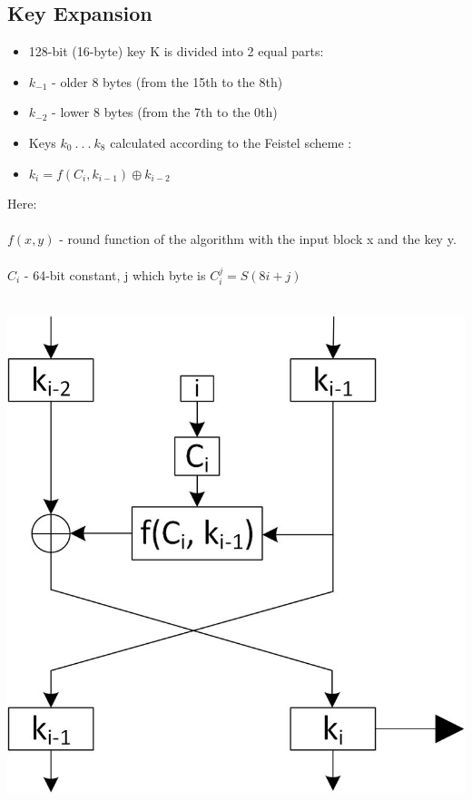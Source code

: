 \documentclass[preprint]{transcrypto}
\begin{document}
\subsection{Key Expansion}
\begin{itemize}
    \item 128-bit (16-byte) key K is divided into 2 equal parts:
    \item $k_{-1}$ - older 8 bytes (from the 15th to the 8th) 
    \item $k_{-2}$ - lower 8 bytes (from the 7th to the 0th) 
    \item Keys $k_{0} \ .\ .\ . \ k_{8}$ calculated according to the Feistel scheme : 
    \item $k_{i} = f(C_{i}, k_{i-1}) \oplus k_{i-2}$ 
\end{itemize}
Here:\\ \\
$f(x, y)$ - round function of the algorithm with the input block x and the key y.\\ \\
$C_{i}$ - 64-bit constant, j which byte is $C_{i}^{j} = S (8i + j)$ \\ \\
\begin{center}
    \includegraphics[scale=0.2]{Screenshots/KHAZAD_Key_Schedule_Feistel.jpg}
\end{center}
\end{document}
